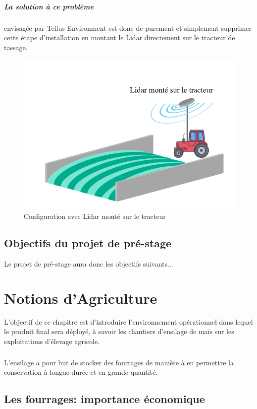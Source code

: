 \documentclass[12pt,a4paper]{report}
\begin{document}
\paragraph{La solution à ce problème} envisagée par Tellus Environment est donc de purement et simplement supprimer cette étape d'installation en montant le Lidar directement sur le tracteur de tassage.

\begin{figure}[H]
	\centering
	\includegraphics[width=0.7\linewidth]{img/LidarMobile}
	\caption{Configuration avec Lidar monté sur le tracteur}
	\label{fig:lidarmobile}
\end{figure}


\section{Objectifs du projet de pré-stage}
Le projet de pré-stage aura donc les objectifs suivants...

\chapter{Notions d'Agriculture}

L'objectif de ce chapitre est d'introduire l'environnement opérationnel dans lequel le produit final sera déployé, à savoir les chantiers d'ensilage de maïs sur les exploitations d'élevage agricole.

\paragraph{}

L'ensilage a pour but de stocker des fourrages de manière à en permettre la conservation à longue durée et en grande quantité.


\section{Les fourrages: importance économique}
\end{document}
